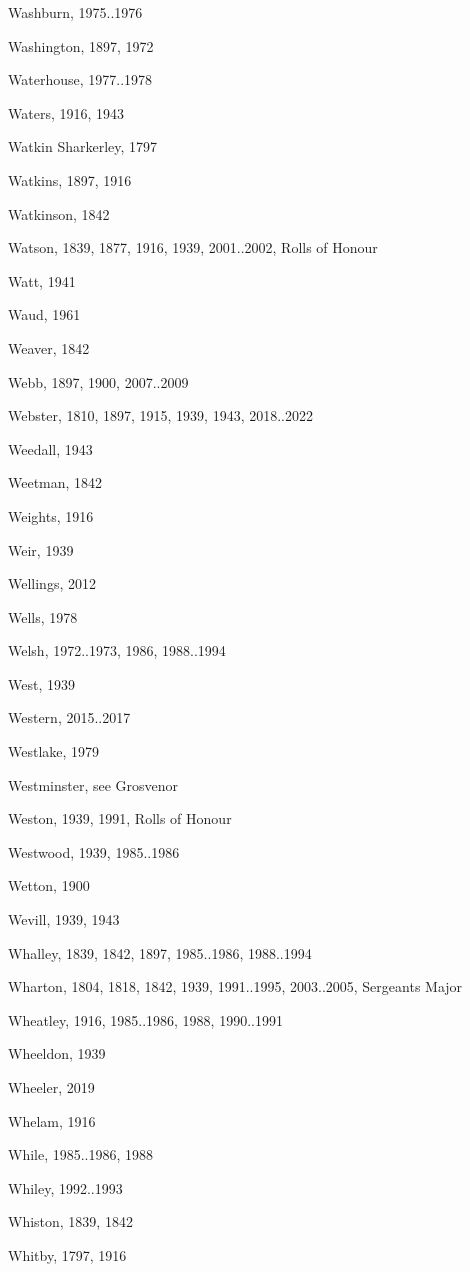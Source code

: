 {\begin{theindex}
\item Washburn, 1975..1976
\item Washington, 1897, 1972
\item Waterhouse, 1977..1978
\item Waters, 1916, 1943
\item Watkin Sharkerley, 1797
\item Watkins, 1897, 1916
\item Watkinson, 1842
\item Watson, 1839, 1877, 1916, 1939, 2001..2002, Rolls of Honour
\item Watt, 1941
\item Waud, 1961
\item Weaver, 1842
\item Webb, 1897, 1900, 2007..2009
\item Webster, 1810, 1897, 1915, 1939, 1943, 2018..2022
\item Weedall, 1943
\item Weetman, 1842
\item Weights, 1916
\item Weir, 1939
\item Wellings, 2012
\item Wells, 1978
\item Welsh, 1972..1973, 1986, 1988..1994
\item West, 1939
\item Western, 2015..2017
\item Westlake, 1979
\item Westminster, see Grosvenor
\item Weston, 1939, 1991, Rolls of Honour
\item Westwood, 1939, 1985..1986
\item Wetton, 1900
\item Wevill, 1939, 1943
\item Whalley, 1839, 1842, 1897, 1985..1986, 1988..1994
\item Wharton, 1804, 1818, 1842, 1939, 1991..1995, 2003..2005, Sergeants Major
\item Wheatley, 1916, 1985..1986, 1988, 1990..1991
\item Wheeldon, 1939
\item Wheeler, 2019
\item Whelam, 1916
\item While, 1985..1986, 1988
\item Whiley, 1992..1993
\item Whiston, 1839, 1842
\item Whitby, 1797, 1916

\end{theindex}}
